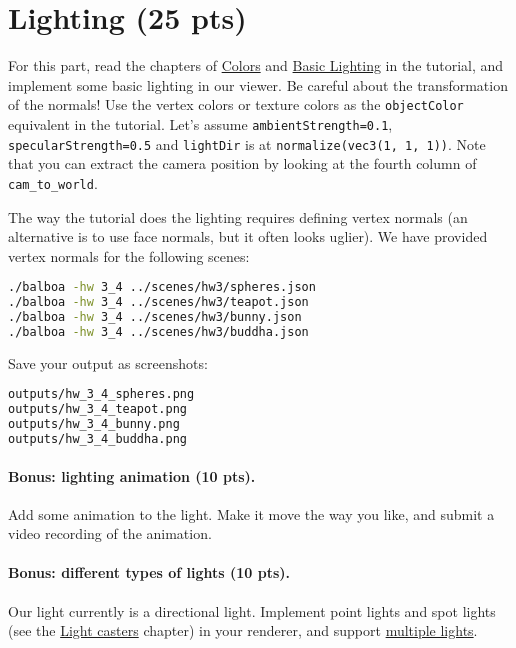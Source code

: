 \section{Lighting (25 pts)}
For this part, read the chapters of \href{https://learnopengl.com/Lighting/Colors}{Colors} and \href{https://learnopengl.com/Lighting/Basic-Lighting}{Basic Lighting} in the tutorial, and implement some basic lighting in our viewer. Be careful about the transformation of the normals! Use the vertex colors or texture colors as the \lstinline{objectColor} equivalent in the tutorial. Let's assume \lstinline{ambientStrength=0.1}, \lstinline{specularStrength=0.5} and \lstinline{lightDir} is at \lstinline{normalize(vec3(1, 1, 1))}. Note that you can extract the camera position by looking at the fourth column of \lstinline{cam_to_world}.

The way the tutorial does the lighting requires defining vertex normals (an alternative is to use face normals, but it often looks uglier). We have provided vertex normals for the following scenes:
\begin{lstlisting}[language=bash]
./balboa -hw 3_4 ../scenes/hw3/spheres.json
./balboa -hw 3_4 ../scenes/hw3/teapot.json
./balboa -hw 3_4 ../scenes/hw3/bunny.json
./balboa -hw 3_4 ../scenes/hw3/buddha.json
\end{lstlisting}

Save your output as screenshots:
\begin{lstlisting}[language=bash]
outputs/hw_3_4_spheres.png
outputs/hw_3_4_teapot.png
outputs/hw_3_4_bunny.png
outputs/hw_3_4_buddha.png
\end{lstlisting}

\paragraph{Bonus: lighting animation (10 pts).} Add some animation to the light. Make it move the way you like, and submit a video recording of the animation.

\paragraph{Bonus: different types of lights (10 pts).} Our light currently is a directional light. Implement point lights and spot lights (see the \href{https://learnopengl.com/Lighting/Light-casters}{Light casters} chapter) in your renderer, and support \href{https://learnopengl.com/Lighting/Multiple-lights}{multiple lights}.

